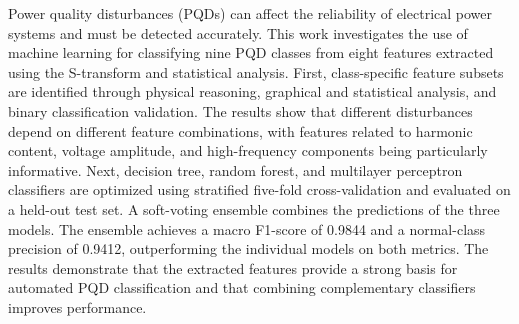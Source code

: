Power quality disturbances (PQDs) can affect the reliability of electrical power systems and must be detected accurately. This work investigates the use of machine learning for classifying nine PQD classes from eight features extracted using the S-transform and statistical analysis. First, class-specific feature subsets are identified through physical reasoning, graphical and statistical analysis, and binary classification validation. The results show that different disturbances depend on different feature combinations, with features related to harmonic content, voltage amplitude, and high-frequency components being particularly informative. Next, decision tree, random forest, and multilayer perceptron classifiers are optimized using stratified five-fold cross-validation and evaluated on a held-out test set. A soft-voting ensemble combines the predictions of the three models. The ensemble achieves a macro F1-score of 0.9844 and a normal-class precision of 0.9412, outperforming the individual models on both metrics. The results demonstrate that the extracted features provide a strong basis for automated PQD classification and that combining complementary classifiers improves performance.
